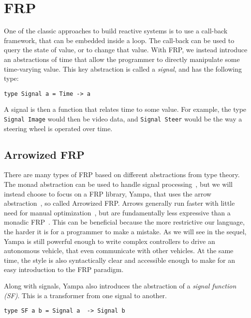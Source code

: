 \section{FRP}

One of the classic approaches to build reactive systems is to use a call-back framework, that can be embedded inside a loop.
The call-back can be used to query the state of value, or to change that value.
With FRP, we instead introduce an abstractions of time that allow the programmer to directly manipulate some time-varying value.
This key abstraction is called a \textit{signal}, and has the following type:

\begin{lstlisting}
type Signal a = Time -> a
\end{lstlisting}

A signal is then a function that relates time to some value.
For example, the type \texttt{Signal Image} would then be video data, and \texttt{Signal Steer} would be the way a steering wheel is operated over time.

\subsection{Arrowized FRP}

There are many types of FRP based on different abstractions from type theory.
The monad abstraction can be used to handle signal processing~\cite{van2014monadic},
  but we will instead choose to focus on a FRP library, Yampa, that uses the arrow abstraction~\cite{hudak2003arrows}, so called Arrowized FRP.
Arrows generally run faster with little need for manual optimization~\cite{yallop2016causal}, but are fundamentally less expressive than a monadic FRP~\cite{lindley2011idioms}.
This can be beneficial because the more restrictive our language, the harder it is for a programmer to make a mistake.
As we will see in the sequel, Yampa is still powerful enough to write complex controllers to drive an autonomous vehicle, that even communicate with other vehicles.
At the same time, the style is also syntactically clear and accessible enough to make for an easy introduction to the FRP paradigm.

Along with signals, Yampa also introduces the abstraction of a \textit{signal function (SF)}.
This is a transformer from one signal to another.

\begin{lstlisting}
type SF a b = Signal a  -> Signal b
\end{lstlisting}

